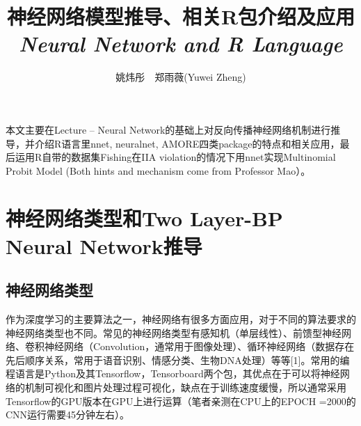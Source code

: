 \documentclass[cn]{elegantpaper}
\title{神经网络模型推导、相关R包介绍及应用\\ \emph{Neural Network and R Language}}
\author{姚炜彤~\quad\ 郑雨薇(Yuwei Zheng)}
\begin{document}
\maketitle

\songti 本文主要在Lecture – Neural Network的基础上对反向传播神经网络机制进行推导，并介绍R语言里nnet, neuralnet, AMORE四类package的特点和相关应用，最后运用R自带的数据集Fishing在IIA violation的情况下用nnet实现Multinomial Probit Model (Both hints and mechanism come from Professor Mao）。


\section{神经网络类型和Two Layer-BP Neural Network推导}
\subsection{神经网络类型}
作为深度学习的主要算法之一，神经网络有很多方面应用，对于不同的算法要求的神经网络类型也不同。常见的神经网络类型有感知机（单层线性）、前馈型神经网络、卷积神经网络（Convolution，通常用于图像处理）、循环神经网络（数据存在先后顺序关系，常用于语音识别、情感分类、生物DNA处理）等等[1]。常用的编程语言是Python及其Tensorflow，Tensorboard两个包，其优点在于可以将神经网络的机制可视化和图片处理过程可视化，缺点在于训练速度缓慢，所以通常采用Tensorflow的GPU版本在GPU上进行运算（笔者亲测在CPU上的EPOCH =2000的CNN运行需要45分钟左右）。
\end{document}
